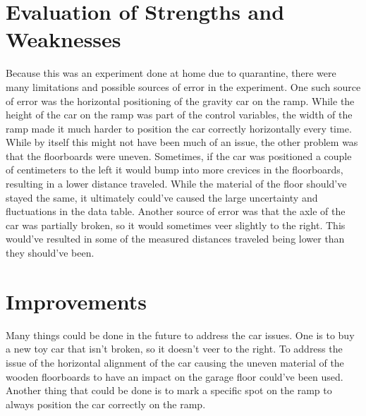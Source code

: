 \documentclass[12pt]{article}
\begin{document}
\section{Evaluation of Strengths and Weaknesses}
Because this was an experiment done at home due to quarantine, there were many limitations and possible sources of error in the experiment. One such source of error was the horizontal positioning of the gravity car on the ramp. While the height of the car on the ramp was part of the control variables, the width of the ramp made it much harder to position the car correctly horizontally every time. While by itself this might not have been much of an issue, the other problem was that the floorboards were uneven. Sometimes, if the car was positioned a couple of centimeters to the left it would bump into more crevices in the floorboards, resulting in a lower distance traveled. While the material of the floor should've stayed the same, it ultimately could've caused the large uncertainty and fluctuations in the data table. Another source of error was that the axle of the car was partially broken, so it would sometimes veer slightly to the right. This would've resulted in some of the measured distances traveled being lower than they should've been.

\section{Improvements}
Many things could be done in the future to address the car issues. One is to buy a new toy car that isn't broken, so it doesn't veer to the right. To address the issue of the horizontal alignment of the car causing the uneven material of the wooden floorboards to have an impact on the garage floor could've been used. Another thing that could be done is to mark a specific spot on the ramp to always position the car correctly on the ramp.
\end{document}
